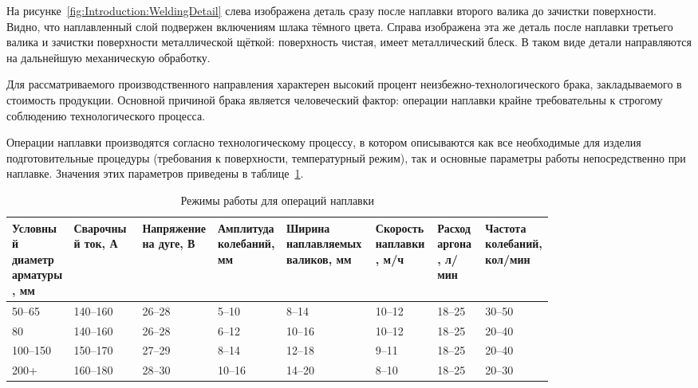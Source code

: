 На рисунке~\ref{fig:Introduction:WeldingDetail} слева изображена деталь сразу после наплавки второго валика до зачистки поверхности.
Видно, что наплавленный слой подвержен включениям шлака тёмного цвета.
Справа изображена эта же деталь после наплавки третьего валика и зачистки поверхности металлической щёткой: поверхность чистая, имеет металлический блеск.
В таком виде детали направляются на дальнейшую механическую обработку.

Для рассматриваемого производственного направления характерен высокий процент неизбежно-технологического брака, закладываемого в стоимость продукции.
Основной причиной брака является человеческий фактор: операции наплавки крайне требовательны к строгому соблюдению технологического процесса.

Операции наплавки производятся согласно технологическому процессу, в котором описываются как все необходимые для изделия подготовительные процедуры (требования к поверхности, температурный режим), так и основные параметры работы непосредственно при наплавке.
Значения этих параметров приведены в таблице~\ref{tab:Introduction:WeldingParameters}.

\begin{table}[H]
    \footnotesize
    \caption{Режимы работы для операций наплавки}
    \label{tab:Introduction:WeldingParameters}
    \begin{tabular}{|p{0.09\linewidth}|p{0.1\linewidth}|p{0.11\linewidth}|p{0.1\linewidth}|p{0.13\linewidth}|p{0.09\linewidth}|p{0.07\linewidth}|p{0.1\linewidth}|}
        \hline
        Условный диаметр арматуры, мм & Сварочный ток, А & Напряжение на дуге, В & Амплитуда колебаний, мм & Ширина наплавляемых валиков, мм & Скорость наплавки, м/ч & Расход аргона, л/мин & Частота колебаний, кол/мин \\ \hline
        50--65                        & 140--160         & 26--28                & 5--10                   & 8--14                           & 10--12                 & 18--25               & 30--50                     \\ \hline
        80                            & 140--160         & 26--28                & 6--12                   & 10--16                          & 10--12                 & 18--25               & 20--40                     \\ \hline
        100--150                      & 150--170         & 27--29                & 8--14                   & 12--18                          & 9--11                  & 18--25               & 20--40                     \\ \hline
        200+                          & 160--180         & 28--30                & 10--16                  & 14--20                          & 8--10                  & 18--25               & 20--30                     \\ \hline
    \end{tabular}
\end{table}

